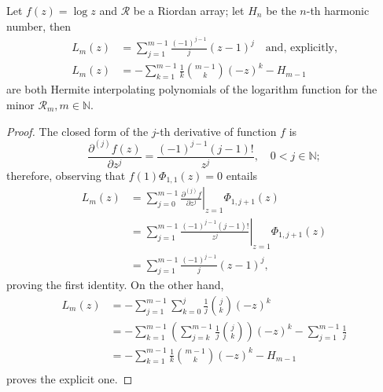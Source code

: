 
\begin{theorem}
\label{thm:log-Hermite-interpolating-poly-implicit}
Let $f(z)=\log{z}$ and $\mathcal{R}$ be a Riordan array; let $H_{n}$ be the
$n$-th harmonic number, then 
\begin{equation}
  \label{eq:log-Hermite-interpolating-poly}
  \begin{split}
  L_{m}(z) &= \sum_{j=1}^{m-1}{\frac{(-1)^{j-1}}{j}{\left(z-1\right)^{j} }}
  \quad\text{and, explicitly,}\\
  L_{m}(z) &= - \sum_{k=1}^{m-1}\frac{1}{k}{{m-1}\choose{k}}{(-z)^{k}}- H_{m-1} 
  \end{split}
\end{equation}
are both Hermite interpolating polynomials of the logarithm function for the minor
$\mathcal{R}_{m}, m\in\mathbb{N}$.
\end{theorem}

\begin{proof}
The closed form of the $j$-th derivative of function $f$ is 
$$\frac{\partial^{(j)}{f}(z)}{\partial{z}^{j}} =\frac{(-1)^{j-1}(j-1)!}{z^{j}}, \quad 0<j\in\mathbb{N};$$ 
therefore, observing that $f(1)\Phi_{1,1}(z)=0$ entails
\begin{displaymath}
\begin{split}
  L_{m}(z)  &= \sum_{j=0}^{m-1}{ \left. \frac{\partial^{(j)}{f}}{\partial{z}^{j}} \right|_{z=1}\Phi_{1,j+1}(z)}\\
            &= \sum_{j=1}^{m-1}{ \left. \frac{(-1)^{j-1}(j-1)!}{z^{j}} \right|_{z=1}\Phi_{1,j+1}(z)}\\
            &= \sum_{j=1}^{m-1}{ \frac{(-1)^{j-1}}{j} (z-1)^{j}},
\end{split}
\end{displaymath}
proving the first identity. On the other hand,
\begin{displaymath}
\begin{split}
  L_{m}(z)  &= - \sum_{j=1}^{m-1}{\sum_{k=0}^{j}{\frac{1}{j}{{j}\choose{k}}(-z)^{k}}}\\
            &= - \sum_{k=1}^{m-1}{\left(\sum_{j=k}^{m-1}{\frac{1}{j}{{j}\choose{k}}}\right)}(-z)^{k} - \sum_{j=1}^{m-1}{\frac{1}{j}}\\
            &= - \sum_{k=1}^{m-1}\frac{1}{k}{{m-1}\choose{k}}{(-z)^{k}}- H_{m-1} \\
\end{split}
\end{displaymath}
proves the explicit one.
\end{proof}

